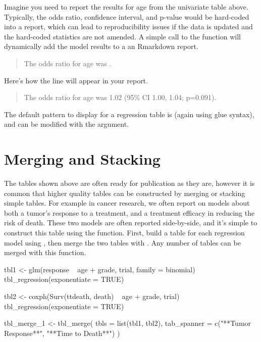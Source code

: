 Imagine you need to report the results for age from the univariate table above.
Typically, the odds ratio, confidence interval, and p-value would be hard-coded into a report, which can lead to reproducibility issues if the data is updated and the hard-coded statistics are not amended.
A simple call to the  function will dynamically add the model results to a an Rmarkdown report.

\begin{quote}
The odds ratio for age was .
\end{quote}

Here's how the line will appear in your report.

\begin{quote}
The odds ratio for age was 1.02 (95\% CI 1.00, 1.04; p=0.091).
\end{quote}

The default pattern to display for a regression table is  (again using glue syntax), and can be modified with the  argument. 

\section{Merging and Stacking}

The  tables shown above are often ready for publication as they are, however it is common that higher quality tables can be constructed by merging or stacking simple tables.
For example in cancer research, we often report on models about both a tumor's response to a treatment, and a treatment efficacy in reducing the risk of death.
These two models are often reported side-by-side, and it's simple to construct this table using  the  function.
First, build a table for each regression model using , then merge the two tables with . Any number of  tables can be merged with this function.

\newpage
\begin{example}
tbl1 <- 
  glm(response ~ age + grade, trial, family = binomial) %
  tbl_regression(exponentiate = TRUE)

tbl2 <-
  coxph(Surv(ttdeath, death) ~ age + grade, trial) %
  tbl_regression(exponentiate = TRUE) 

tbl_merge_1 <-
  tbl_merge(
    tbls = list(tbl1, tbl2),
    tab_spanner = c("**Tumor Response**", "**Time to Death**")
  )
\end{example}


